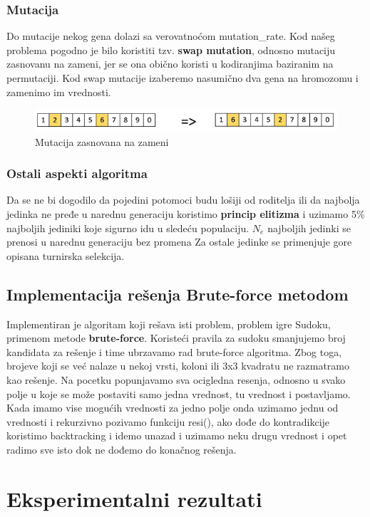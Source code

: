 \documentclass[a4paper]{article}
\begin{document}
\subsubsection{Mutacija}
Do mutacije nekog gena dolazi sa verovatnoćom mutation\_rate. Kod našeg problema pogodno je bilo koristiti tzv. \textbf{swap mutation}, odnosno mutaciju zasnovanu na zameni, jer se ona obično koristi u kodiranjima baziranim na permutaciji. Kod swap mutacije izaberemo nasumično dva gena na hromozomu i zamenimo im vrednosti. 

\begin{figure}[h]
    \centering
    \includegraphics[scale=0.5]{swap_mutation (1).jpg}
    \caption{Mutacija zasnovana na zameni}
    \label{fig:swap}
\end{figure}
\subsubsection{Ostali aspekti algoritma}
Da se ne bi dogodilo da  pojedini potomoci budu lošiji od roditelja ili da najbolja jedinka ne pređe u narednu generaciju koristimo \textbf{princip elitizma} i uzimamo 5\% najboljih jediniki koje sigurno idu u sledeću populaciju. $N_e$ najboljih jedinki se prenosi u narednu generaciju bez promena Za ostale jedinke se primenjuje gore opisana turnirska selekcija.
\subsection{Implementacija rešenja Brute-force metodom}
Implementiran je algoritam koji rešava isti problem, problem igre Sudoku, primenom metode \textbf{brute-force}. Koristeći pravila za sudoku smanjujemo broj kandidata za rešenje i time ubrzavamo rad brute-force algoritma. Zbog toga, brojeve koji se već nalaze u nekoj vrsti, koloni ili 3x3 kvadratu ne razmatramo kao rešenje. Na pocetku popunjavamo sva ocigledna resenja, odnosno u svako polje u koje se može postaviti samo jedna vrednost, tu vrednost i postavljamo. Kada imamo vise mogućih vrednosti za jedno polje onda uzimamo jednu od vrednosti i rekurzivno pozivamo funkciju resi(), ako dođe do kontradikcije koristimo backtracking i idemo unazad i uzimamo neku drugu vrednost i opet radimo sve isto dok ne dođemo do konačnog rešenja.

\section{Eksperimentalni rezultati}
\end{document}
